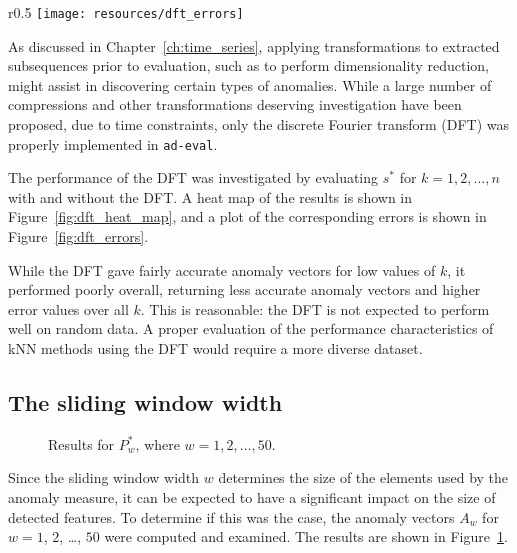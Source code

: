 \begin{wrapfigure}{r}{0.5\textwidth}
\changecaptionwidth
{}
\texttt{[image: resources/dft\_errors]}
\caption{\small{Errors of the $A_{k, t}$.}}
\label{fig:dft_errors}
\end{wrapfigure}

As discussed in Chapter~\ref{ch:time_series}, applying transformations to extracted subsequences prior to evaluation, such as to perform dimensionality reduction, might assist in discovering certain types of anomalies. While a large number of compressions and other transformations deserving investigation have been proposed, due to time constraints, only the discrete Fourier transform (DFT) was properly implemented in \texttt{ad-eval}.

The performance of the DFT was investigated by evaluating $s^*$ for $k = 1,2,\dots, n$ with and without the DFT\@. A heat map of the results is shown in Figure~\ref{fig:dft_heat_map}, and a plot of the corresponding errors is shown in Figure~\ref{fig:dft_errors}.

While the DFT gave fairly accurate anomaly vectors for low values of $k$, it performed poorly overall, returning less accurate anomaly vectors and higher error values over all $k$. This is reasonable: the DFT is not expected to perform well on random data. A proper evaluation of the performance characteristics of kNN methods using the DFT would require a more diverse dataset.

\subsection{The sliding window width}
\label{sect:w}

\begin{figure}
    \centering
    \caption{Results for $P^*_w$, where $w = 1, 2, \dots, 50$.}
\label{fig:w_plot}
\end{figure}

Since the sliding window width $w$ determines the size of the elements used by the anomaly measure, it can be expected to have a significant impact on the size of detected features. To determine if this was the case, the anomaly vectors $A_w$ for $w = 1$, $2$, \dots, $50$ were computed and examined. The results are shown in Figure~\ref{fig:w_plot}.

